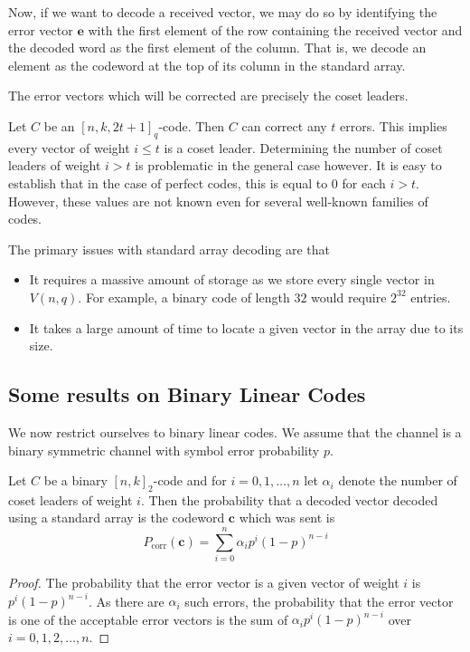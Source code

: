 \vspace{2mm}
Now, if we want to decode a received vector, we may do so by identifying the error vector $\textbf{e}$ with the first element of the row containing the received vector and the decoded word as the first element of the column. That is, we decode an element as the codeword at the top of its column in the standard array.

\vspace{1mm}
The error vectors which will be corrected are precisely the coset leaders.

\vspace{2mm}
Let $C$ be an $[n,k,2t+1]_q$-code. Then $C$ can correct any $t$ errors. This implies every vector of weight $i\leq t$ is a coset leader. Determining the number of coset leaders of weight $i>t$ is problematic in the general case however. It is easy to establish that in the case of perfect codes, this is equal to $0$ for each $i>t$. However, these values are not known even for several well-known families of codes.

\vspace{2mm}
The primary issues with standard array decoding are that
\begin{itemize}
    \item It requires a massive amount of storage as we store every single vector in $V(n,q)$. For example, a binary code of length $32$ would require $2^{32}$ entries.
    \item It takes a large amount of time to locate a given vector in the array due to its size.
\end{itemize}

\subsection{Some results on Binary Linear Codes}
We now restrict ourselves to binary linear codes. We assume that the channel is a binary symmetric channel with symbol error probability $p$.

\begin{theorem}
    Let $C$ be a binary $[n,k]_2$-code and for $i=0,1,\ldots,n$ let $\alpha_i$ denote the number of coset leaders of weight $i$. Then the probability that a decoded vector decoded using a standard array is the codeword $\textbf{c}$ which was sent is
    $$P_\text{corr}(\textbf{c})=\sum_{i=0}^n\alpha_ip^i(1-p)^{n-i}$$
\end{theorem}
\begin{proof}
    The probability that the error vector is a given vector of weight $i$ is $p^i(1-p)^{n-i}$. As there are $\alpha_i$ such errors, the probability that the error vector is one of the acceptable error vectors is the sum of $\alpha_ip^i(1-p)^{n-i}$ over $i=0,1,2,\ldots,n$.
\end{proof}

